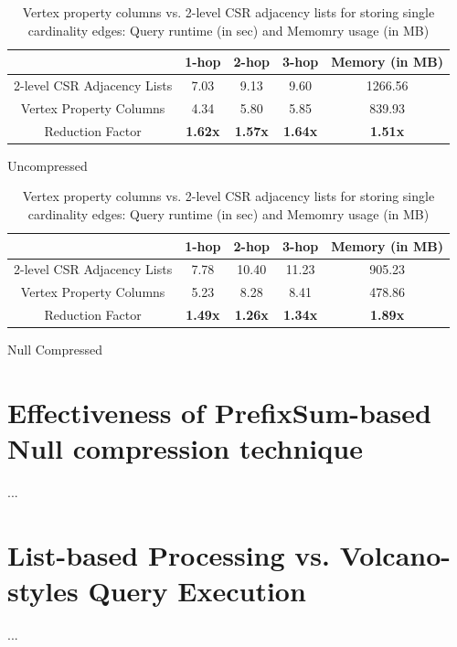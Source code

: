 \begin{table}
	\centering
	\begin{subtable}{1\textwidth}
		\centering
		\bgroup
		\setlength{\tabcolsep}{8pt}
		\def\arraystretch{1.2}%
		\begin{tabular}{ |c|c|c|c|c| }
			\hline
			& \textbf{1-hop} & \textbf{2-hop} & \textbf{3-hop} & \textbf{Memory (in MB)} \\ 
			\hline \hline
			2-level CSR Adjacency Lists& 7.03 & 9.13 & 9.60 & 1266.56 \\ 
			\hline
			Vertex Property Columns& 4.34 & 5.80 & 5.85 & 839.93 \\ 
			\hline \hline
			Reduction Factor& \textbf{1.62x} & \textbf{1.57x} & \textbf{1.64x} & \textbf{1.51x} \\ 
			\hline
		\end{tabular}
		\egroup
		\captionsetup{justification=centering}
		\caption{Uncompressed}
		\label{tbl:mem2}
	\end{subtable}
	\begin{subtable}{1\textwidth}
		\centering
		\bgroup
		\setlength{\tabcolsep}{8pt}
		\def\arraystretch{1.2}%
		\begin{tabular}{ |c|c|c|c|c| } 
			\hline
			& \textbf{1-hop} & \textbf{2-hop} & \textbf{3-hop} & \textbf{Memory (in MB)} \\ 
			\hline \hline
			2-level CSR Adjacency Lists& 7.78 & 10.40 & 11.23 & 905.23 \\ 
			\hline
			Vertex Property Columns& 5.23 & 8.28 & 8.41 & 478.86 \\ 
			\hline \hline
			Reduction Factor& \textbf{1.49x} & \textbf{1.26x} & \textbf{1.34x} & \textbf{1.89x} \\ 
			\hline
		\end{tabular}
		\egroup
		\captionsetup{justification=centering}
		\caption{Null Compressed}
		\label{tbl:mem2}
	\end{subtable}
	\captionsetup{justification=centering}
	\caption{Vertex property columns vs. 2-level CSR adjacency lists for storing single cardinality edges: Query runtime (in sec) and Memomry usage (in MB)  }
\end{table}

\section{Effectiveness of PrefixSum-based Null compression technique}
\label{exp:prefixSum}

...

\section{List-based Processing vs. Volcano-styles Query Execution}
\label{exp:list-based}

...
